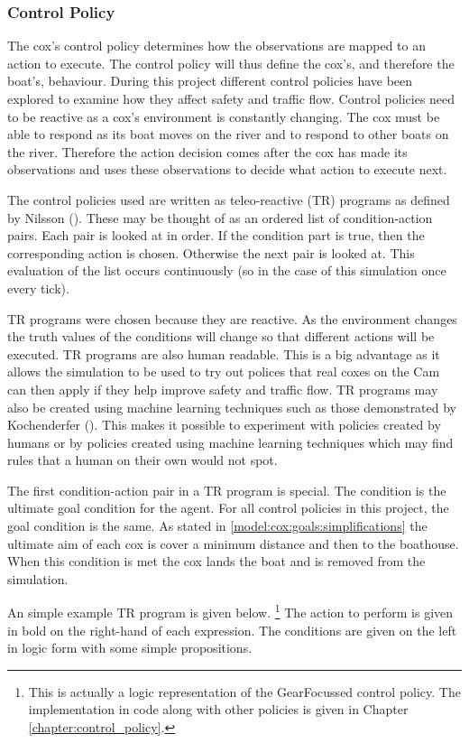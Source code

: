       \subsubsection{Control Policy}
      The cox's control policy determines how the observations are mapped to an action to execute. The control policy will thus define the cox's, and therefore the boat's, behaviour. During this project different control policies have been explored to examine how they affect safety and traffic flow. Control policies need to be reactive as a cox's environment is constantly changing. The cox must be able to respond as its boat moves on the river and to respond to other boats on the river. Therefore the action decision comes after the cox has made its observations and uses these observations to decide what action to execute next.
      
      The control policies used are written as teleo-reactive (TR) programs as defined by Nilsson (\cite{Nilsson1994}). These may be thought of as an ordered list of condition-action pairs. Each pair is looked at in order. If the condition part is true, then the corresponding action is chosen. Otherwise the next pair is looked at. This evaluation of the list occurs continuously (so in the case of this simulation once every tick). 
      
      TR programs were chosen because they are reactive. As the environment changes the truth values of the conditions will change so that different actions will be executed. TR programs are also human readable. This is a big advantage as it allows the simulation to be used to try out polices that real coxes on the Cam can then apply if they help improve safety and traffic flow. TR programs may also be created using machine learning techniques such as those demonstrated by Kochenderfer (\cite{Kochenderfer2003}). This makes it possible to experiment with policies created by humans or by policies created using machine learning techniques which may find rules that a human on their own would not spot.
      
      The first condition-action pair in a TR program is special. The condition is the ultimate goal condition for the agent. For all control policies in this project, the goal condition is the same. As stated in \ref{model:cox:goals:simplifications} the ultimate aim of each cox is cover a minimum distance and then to the boathouse. When this condition is met the cox lands the boat and is removed from the simulation.

An simple example TR program is given below. \footnote{This is actually a logic representation of the GearFocussed control policy. The implementation in code along with other policies is given in Chapter \ref{chapter:control_policy}.} The action to perform is given in bold on the right-hand of each expression. The conditions are given on the left in logic form with some simple propositions.

